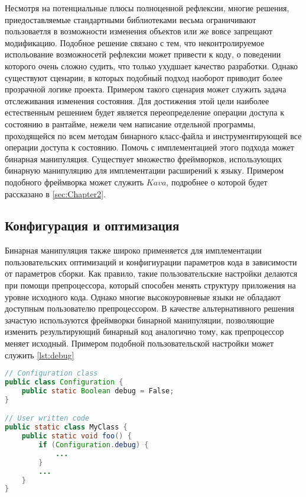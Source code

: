 Несмотря на потенциальные плюсы полноценной рефлексии, многие решения, приедоставляемые стандартными библиотеками весьма ограничивают пользоваетля в возможности изменения объектов или же вовсе запрещают модификацию. Подобное решение связано с тем, что неконтролируемое испольование возможносетй рефлексии может привести к коду, о поведении которого очень сложно судить, что только ухудшает качество разработки. Однако существуют сценарии, в которых подобный подход наоборот приводит более прозрачной логике проекта. Примером такого сценария может служить задача отслеживания изменения состояния. Для достижения этой цели наиболее естественным решением будет является переопределение операции доступа к состоянию в рантайме, нежели чем написание отдельной программы, проходящейся по всем методам бинарного класс-файла и инструментирующей все операции доступа к состоянию. Помочь с имплементацией этого подхода может бинарная манипуляция. Существует множество фреймворков, использующих бинарную манипуляцию для имплементации расширений к языку. Примером подобного фреймворка может служить $Kava$, подробнее о которой будет рассказано в \autoref{sec:Chapter2}.

\subsection{Конфигурация и оптимизация}

Бинарная манипуляция также широко применяется для имплементации пользовательских оптимизаций и конфигиурации параметров кода в зависимости от параметров сборки. Как правило, такие пользовательские настройки делаются при помощи препроцессора, который способен менять структуру приложения на уровне исходного кода. Однако многие высокоуровневые языки не обладают доступным пользователю препроцессором. В качестве альтернативного решения зачастую используются фреймворки бинарной манипуляции, позволяющие изменить результирующий бинарный код аналогично тому, как препроцессор меняет исходный. Примером подобной пользовательской настройки может служить \autoref{lst:debug}

\begin{lstlisting}[language=Java, caption=Пример использования класса с конфигурацией проекта, label=lst:debug]
// Configuration class
public class Configuration {
    public static Boolean debug = False;
}

// User written code
public static class MyClass {
    public static void foo() {
        if (Configuration.debug) {
            ...
        }
        ...
    }
}
\end{lstlisting}

